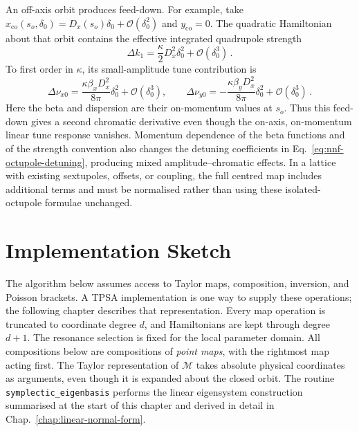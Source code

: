An off-axis orbit produces feed-down.  For example, take
$x_{\mathrm{co}}(s_o,\delta_0) = D_x(s_o)\delta_0 + \mathcal O(\delta_0^2)$
and $y_{\mathrm{co}} = 0$.  The quadratic Hamiltonian about that orbit
contains the effective integrated quadrupole strength
\begin{equation}
    \Delta k_1 = \frac{\kappa}{2}D_x^2\delta_0^2 + \mathcal O(\delta_0^3)\,.
\end{equation}
To first order in $\kappa$, its small-amplitude tune contribution is
\begin{equation}\label{eq:nnf-octupole-chromaticity}
    \Delta\nu_{x0} = \frac{\kappa\beta_xD_x^2}{8\pi}\delta_0^2 + \mathcal O(\delta_0^3),\qquad
    \Delta\nu_{y0} = -\frac{\kappa\beta_yD_x^2}{8\pi}\delta_0^2 + \mathcal O(\delta_0^3)\,.
\end{equation}
Here the beta and dispersion are their on-momentum values at $s_o$.
Thus this feed-down gives a second chromatic derivative even though the
on-axis, on-momentum linear tune response vanishes.  Momentum dependence
of the beta functions and of the strength convention also changes the
detuning coefficients in Eq.~\eqref{eq:nnf-octupole-detuning}, producing
mixed amplitude--chromatic effects.  In a lattice with existing sextupoles,
offsets, or coupling, the full centred map includes additional terms and
must be normalised rather than using these isolated-octupole formulae
unchanged.



\section{Implementation Sketch}

The algorithm below assumes access to Taylor maps, composition, inversion,
and Poisson brackets.  A TPSA implementation is one way to supply these
operations; the following chapter describes that representation.  Every
map operation is truncated to coordinate degree $d$, and Hamiltonians are
kept through degree $d + 1$.  The resonance selection is fixed for the local
parameter domain.  All compositions below are compositions of
\emph{point maps}, with the rightmost map acting first.
The Taylor representation of $\mathcal M$ takes absolute physical
coordinates as arguments, even though it is expanded about the closed
orbit.  The routine \texttt{symplectic\_eigenbasis} performs the linear
eigensystem construction summarised at the start of this chapter and derived
in detail in Chap.~\ref{chap:linear-normal-form}.

